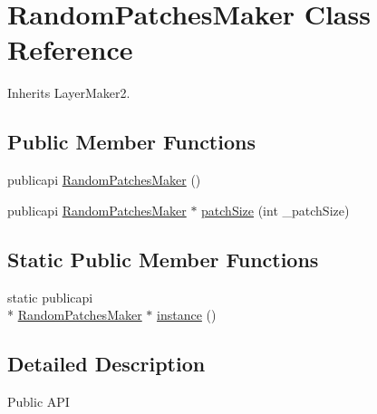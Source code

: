 \hypertarget{classRandomPatchesMaker}{\section{Random\-Patches\-Maker Class Reference}
\label{classRandomPatchesMaker}
}


Inherits Layer\-Maker2.

\subsection*{Public Member Functions}
\begin{DoxyCompactItemize}
\item 
publicapi \hyperlink{classRandomPatchesMaker_ab97dbb34dfa2a30f1b6ef64c43325191}{Random\-Patches\-Maker} ()
\item 
publicapi \hyperlink{classRandomPatchesMaker}{Random\-Patches\-Maker} $\ast$ \hyperlink{classRandomPatchesMaker_a5b9fca22c71b70d275c80b4e41d819b6}{patch\-Size} (int \-\_\-patch\-Size)
\end{DoxyCompactItemize}
\subsection*{Static Public Member Functions}
\begin{DoxyCompactItemize}
\item 
static publicapi \\*
\hyperlink{classRandomPatchesMaker}{Random\-Patches\-Maker} $\ast$ \hyperlink{classRandomPatchesMaker_ad92cc08bc586e7ab9a88f22b422c5787}{instance} ()
\end{DoxyCompactItemize}


\subsection{Detailed Description}
\begin{DoxyParagraph}{Public A\-P\-I}

\end{DoxyParagraph}


